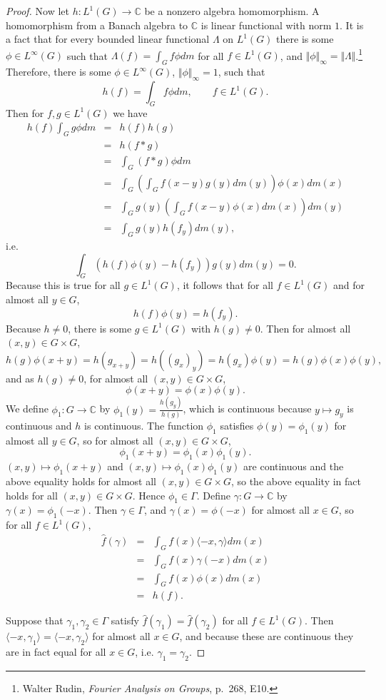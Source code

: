 \documentclass{article}
\newcommand{\inner}[2]{\langle #1, #2 \rangle}
\newcommand{\norm}[1]{\Vert #1 \Vert}
\begin{document}
\begin{proof}
Now let $h:L^1(G) \to \mathbb{C}$ be a nonzero algebra homomorphism. 
A homomorphism from a Banach algebra to $\mathbb{C}$ is linear functional with norm $1$.
It is a fact that for every bounded linear functional $\Lambda$ on $L^1(G)$ there is some $\phi \in
L^\infty(G)$ such that $\Lambda(f)=\int_G f\phi dm$ for all $f \in L^1(G)$, and $\norm{\phi}_\infty= \norm{\Lambda}$.\footnote{Walter Rudin, {\em Fourier Analysis
on Groups}, p.~268, E10.} Therefore, there is some $\phi \in L^\infty(G)$, $\norm{\phi}_\infty=1$, such that
\[
h(f) = \int_G f \phi dm, \qquad f \in L^1(G).
\]
Then for $f,g \in L^1(G)$ we have
\begin{eqnarray*}
h(f) \int_G g \phi dm&=&h(f) h(g)\\
&=&h(f*g)\\
&=&\int_G (f*g) \phi dm\\
&=&\int_G \left( \int_G f(x-y) g(y) dm(y) \right) \phi(x) dm(x)\\
&=&\int_G g(y) \left(\int_G f(x-y) \phi(x) dm(x) \right) dm(y)\\
&=&\int_G g(y) h(f_y) dm(y),
\end{eqnarray*}
i.e.
\[
\int_G (h(f)\phi(y)-h(f_y))g(y) dm(y) = 0.
\]
Because this is true for all $g \in L^1(G)$, it follows that for all $f \in L^1(G)$ and for almost all $y \in G$, 
\[
h(f)\phi(y)=h(f_y).
\] 
Because $h \neq 0$, there is some $g \in L^1(G)$ with
$h(g) \neq 0$.
Then for almost all $(x,y) \in G \times G$,
\[
h(g)\phi(x+y) = h(g_{x+y}) = h((g_x)_y) = h(g_{x})\phi(y) = h(g)\phi(x) \phi(y),
\]
and as $h(g) \neq 0$, for almost all $(x,y) \in G \times G$,
\[
\phi(x+y)=\phi(x)\phi(y).
\]
We define 
$\phi_1:G \to \mathbb{C}$ by $\phi_1(y)=\frac{h(g_{y})}{h(g)}$, which is continuous because
$y \mapsto g_{y}$ is continuous and $h$ is continuous.
The function $\phi_1$ satisfies $\phi(y)=\phi_1(y)$  for almost all $y \in G$, so for almost all $(x,y) \in G \times G$,
\[
\phi_1(x+y)=\phi_1(x)\phi_1(y).
\]
$(x,y) \mapsto \phi_1(x+y)$ and $(x,y) \mapsto \phi_1(x)\phi_1(y)$ are continuous and the above equality
holds for almost all $(x,y) \in G \times G$, so the above equality in fact holds for all $(x,y) \in G \times G$.
Hence $\phi_1 \in \Gamma$.
Define $\gamma:G \to \mathbb{C}$ by $\gamma(x)=\phi_1(-x)$. Then $\gamma \in \Gamma$, and $\gamma(x)=\phi(-x)$ for almost all $x \in G$, so
for all $f \in L^1(G)$,
\begin{eqnarray*}
\hat{f}(\gamma) &=& \int_G f(x)\inner{-x}{\gamma} dm(x) \\
&=& \int_G f(x) \gamma(-x) dm(x)\\
 &=& \int_G f(x) \phi(x) dm(x)\\
 &=&h(f).
\end{eqnarray*}

Suppose that $\gamma_1,\gamma_2 \in \Gamma$ satisfy $\hat{f}(\gamma_1)=\hat{f}(\gamma_2)$ for all $f \in L^1(G)$. Then
$\inner{-x}{\gamma_1}=\inner{-x}{\gamma_2}$ for almost all $x \in G$, and because these are continuous they are in fact equal for all $x \in G$, i.e.
$\gamma_1=\gamma_2$.
\end{proof}
\end{document}
